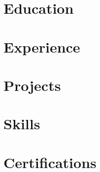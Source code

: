 \documentclass[letterpaper,11pt]{article}
\begin{document}
{}

\section{Education}
\resumeSubHeadingListStart{}
{
  
}
\resumeSubHeadingListEnd{}

\section{Experience}
\resumeSubHeadingListStart{}

{
  
  
  
  
  
  
}

\resumeSubHeadingListEnd{}

\section{Projects}
\resumeSubHeadingListStart{}

{
  
  
  
  
  
  
  
  
  
  
}

\resumeSubHeadingListEnd{}

\section{Skills}
\resumeSubHeadingListStart{}
{
  
  
}
\resumeSubHeadingListEnd{}

\section{Certifications}
\resumeSubHeadingListStart{}
{
  
  
  
}
\resumeSubHeadingListEnd{}

\end{document}
